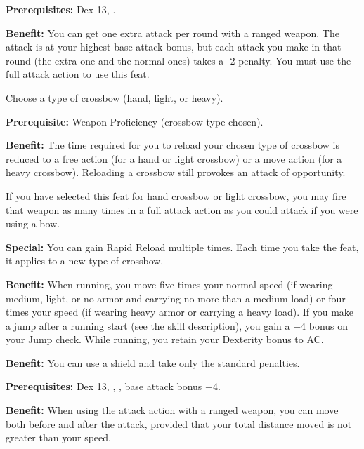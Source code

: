 
\textbf{Prerequisites:} Dex 13, .

\textbf{Benefit:} You can get one extra attack per round with a ranged weapon. The attack is at your highest base attack bonus, but each attack you make in that round (the extra one and the normal ones) takes a -2 penalty. You must use the full attack action to use this feat.


Choose a type of crossbow (hand, light, or heavy).

\textbf{Prerequisite:} Weapon Proficiency (crossbow type chosen).

\textbf{Benefit:} The time required for you to reload your chosen type of crossbow is reduced to a free action (for a hand or light crossbow) or a move action (for a heavy crossbow). Reloading a crossbow still provokes an attack of opportunity.

If you have selected this feat for hand crossbow or light crossbow, you may fire that weapon as many times in a full attack action as you could attack if you were using a bow.

\textbf{Special:} You can gain Rapid Reload multiple times. Each time you take the feat, it applies to a new type of crossbow.


\textbf{Benefit:} When running, you move five times your normal speed (if wearing medium, light, or no armor and carrying no more than a medium load) or four times your speed (if wearing heavy armor or carrying a heavy load). If you make a jump after a running start (see the  skill description), you gain a +4 bonus on your Jump check. While running, you retain your Dexterity bonus to AC.


\textbf{Benefit:} You can use a shield and take only the standard penalties.


\textbf{Prerequisites:} Dex 13, , , base attack bonus +4.

\textbf{Benefit:} When using the attack action with a ranged weapon, you can move both before and after the attack, provided that your total distance moved is not greater than your speed.

